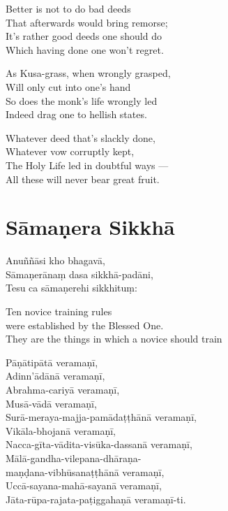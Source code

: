 \clearpage

\begin{english}
  Better is not to do bad deeds\\
  That afterwards would bring remorse;\\
  It's rather good deeds one should do\\
  Which having done one won't regret.

  As Kusa-grass, when wrongly grasped,\\
  Will only cut into one's hand\\
  So does the monk's life wrongly led\\
  Indeed drag one to hellish states.

  Whatever deed that's slackly done,\\
  Whatever vow corruptly kept,\\
  The Holy Life led in doubtful ways ---\\
  All these will never bear great fruit.
\end{english}


\section{Sāmaṇera Sikkhā}


Anuññāsi kho bhagavā,\\
Sāmaṇerānaṃ dasa sikkhā-padāni,\\
Tesu ca sāmaṇerehi sikkhituṃ:\\

\begin{english}
  Ten novice training rules\\
  were established by the Blessed One.\\
  They are the things in which a novice should train
\end{english}

\clearpage

Pāṇātipātā veramaṇī,\\
Adinn'ādānā veramaṇī,\\
Abrahma-cariyā veramaṇī,\\
Musā-vādā veramaṇī,\\
Surā-meraya-majja-pamādaṭṭhānā veramaṇī,\\
Vikāla-bhojanā veramaṇī,\\
Nacca-gīta-vādita-visūka-dassanā veramaṇī,\\
Mālā-gandha-vilepana-dhāraṇa-\\
\vin maṇḍana-vibhūsanaṭṭhānā veramaṇī,\\
Uccā-sayana-mahā-sayanā veramaṇī,\\
Jāta-rūpa-rajata-paṭiggahaṇā veramaṇī-ti.

